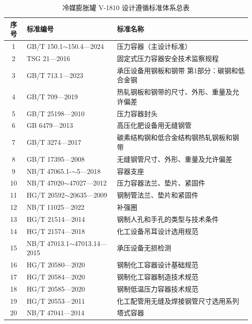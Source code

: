 \begin{table}[htbp]
  \centering
  \caption{冷媒膨胀罐 V-1810 设计遵循标准体系总表}
  \label{tab:cad-standards-full}
  \small\renewcommand{\arraystretch}{1.15}
  \setlength{\tabcolsep}{4pt}
  \begin{tabularx}{\textwidth}{@{}c l >{\raggedright\arraybackslash}X @{}}
    \toprule
    \textbf{序号} & \textbf{标准编号} & \textbf{标准名称} \\
    \midrule
    1  & GB/T 150.1$\sim$150.4—2024    & 压力容器（主设计标准） \\
    2  & TSG 21—2016                    & 固定式压力容器安全技术监察规程 \\
    3  & GB/T 713.1—2023                & 承压设备用钢板和钢带 第1部分：碳钢和低合金钢 \\
    4  & GB/T 709—2019                  & 热轧钢板和钢带的尺寸、外形、重量及允许偏差 \\
    5  & GB/T 25198—2010                & 压力容器封头 \\
    6  & GB 6479—2013                   & 高压化肥设备用无缝钢管 \\
    7  & GB/T 3274—2017                 & 碳素结构钢和低合金结构钢热轧钢板和钢带 \\
    8  & GB/T 17395—2008                & 无缝钢管尺寸、外形、重量及允许偏差 \\
    9  & NB/T 47065.1-$\sim$5—2018      & 容器支座 \\
    10 & NB/T 47020$\sim$47027—2012     & 压力容器法兰、垫片、紧固件 \\
    11 & HG/T 20592$\sim$20635—2009     & 钢制管法兰、垫片和紧固件 \\
    12 & NB/T 11025—2022                & 补强圈 \\
    13 & HG/T 21514—2014                & 钢制人孔和手孔的类型与技术条件 \\
    14 & HG/T 21574—2018                & 化工设备吊耳设计选用规范 \\
    15 & NB/T 47013.1$\sim$47013.14—2015 & 承压设备无损检测 \\
    16 & HG/T 20580—2020                & 钢制化工容器设计基础规范 \\
    17 & HG/T 20584—2020                & 钢制化工容器制造技术规范 \\
    18 & HG/T 20585—2020                & 钢制低温压力容器技术规范 \\
    19 & HG/T 20553—2011                & 化工配管用无缝及焊接钢管尺寸选用系列 \\
    20 & NB/T 47041—2014                & 塔式容器 \\

\end{tabularx}
\end{table}
